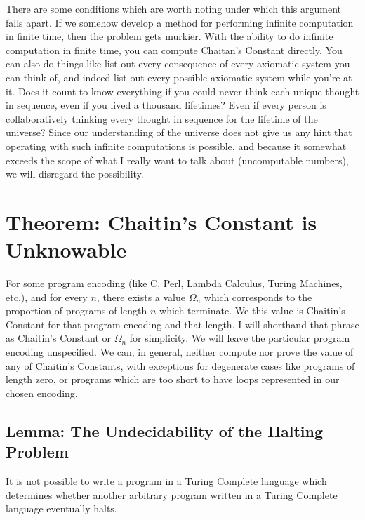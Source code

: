 \documentclass{article}
\begin{document}
There are some conditions which are worth noting under which this argument falls apart. If we somehow develop a method for performing infinite computation in finite time, then the problem gets murkier. With the ability to do infinite computation in finite time, you can compute Chaitan's Constant directly. You can also do things like list out every consequence of every axiomatic system you can think of, and indeed list out every possible axiomatic system while you're at it. Does it count to know everything if you could never think each unique thought in sequence, even if you lived a thousand lifetimes? Even if every person is collaboratively thinking every thought in sequence for the lifetime of the universe? Since our understanding of the universe does not give us any hint that operating with such infinite computations is possible, and because it somewhat exceeds the scope of what I really want to talk about (uncomputable numbers), we will disregard the possibility.

\section{Theorem: Chaitin's Constant is Unknowable}
For some program encoding (like C, Perl, Lambda Calculus, Turing Machines, etc.), and for every $n$, there exists a value $\Omega_n$ which corresponds to the proportion of programs of length $n$ which terminate. We this value is Chaitin's Constant for that program encoding and that length. I will shorthand that phrase as Chaitin's Constant or $\Omega_n$ for simplicity. We will leave the particular program encoding unspecified. We can, in general, neither compute nor prove the value of any of Chaitin's Constants, with exceptions for degenerate cases like programs of length zero, or programs which are too short to have loops represented in our chosen encoding.\\

\subsection{Lemma: The Undecidability of the Halting Problem}
It is not possible to write a program in a Turing Complete language which determines whether another arbitrary program written in a Turing Complete language eventually halts.\\
\end{document}
